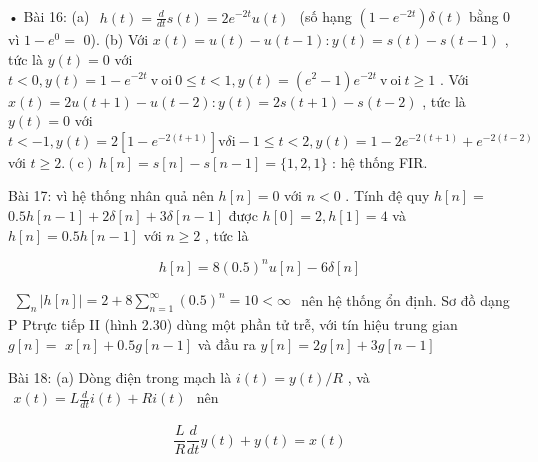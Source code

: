 \documentclass[
  10
]{article}
\begin{document}
• Bài 16: (a)
\(\begin{array} { r } { h ( t ) = \frac { d } { d t } s ( t ) = 2 e ^ { - 2 t } u ( t ) } \end{array}\)
(số hạng \(( 1 - e ^ { - 2 t } ) \delta ( t )\) bằng 0 vì
\(1 - e ^ { 0 } =\) 0). (b) Với
\(x ( t ) = u ( t ) - u ( t - 1 ) \colon y ( t ) = s ( t ) - s ( t - 1 )\)
, tức là \(y ( t ) = 0\) với
\(t < 0 , y ( t ) = 1 - e ^ { - 2 t } \mathrm { ~ v \ o i ~ } 0 \leq t < 1 , y ( t ) = ( e ^ { 2 } - 1 ) e ^ { - 2 t } \mathrm { ~ v \ o i ~ } t \geq 1\)
. Với
\(x ( t ) = 2 u ( t + 1 ) - u ( t - 2 ) \colon y ( t ) = 2 s ( t + 1 ) - s ( t - 2 )\)
, tức là \(y ( t ) = 0\) với
\(t < - 1 , y ( t ) = 2 \left[ 1 - e ^ { - 2 ( t + 1 ) } \right] \mathrm { v } \delta \mathrm { i } - 1 \leq t < 2 , y ( t ) = 1 - 2 e ^ { - 2 ( t + 1 ) } + e ^ { - 2 ( t - 2 ) }\)
với
\(t \geq 2 . \mathrm { ( c ) } \ h [ n ] = s [ n ] - s [ n - 1 ] = \{ 1 , 2 , 1 \}\)
: hệ thống FIR.

Bài 17: vì hệ thống nhân quả nên \(h [ n ] = 0\) với \(n < 0\) . Tính đệ
quy \(h [ n ] =\)
\(0 . 5 h [ n - 1 ] + 2 \delta [ n ] + 3 \delta [ n - 1 ]\) được
\(h [ 0 ] = 2 , h [ 1 ] = 4\) và \(h [ n ] = 0 . 5 h [ n - 1 ]\) với
\(n \geq 2\) , tức là

\[
h [ n ] = 8 (0. 5) ^ {n} u [ n ] - 6 \delta [ n ]
\]

\(\begin{array} { r } { \sum _ { n } | h [ n ] | = 2 + 8 \sum _ { n = 1 } ^ { \infty } ( 0 . 5 ) ^ { n } = 1 0 < \infty } \end{array}\)
nên hệ thống ổn định. Sơ đồ dạng P Ptrực tiếp II (hình 2.30) dùng một
phần tử trễ, với tín hiệu trung gian \(g [ n ] =\)
\(x [ n ] + 0 . 5 g [ n - 1 ]\) và đầu ra
\(y [ n ] = 2 g [ n ] + 3 g [ n - 1 ]\)

Bài 18: (a) Dòng điện trong mạch là \(i ( t ) = y ( t ) / R\) , và
\(\begin{array} { r } { x ( t ) = L \frac { d } { d t } i ( t ) + R i ( t ) } \end{array}\)
nên

\[
\frac {L}{R} \frac {d}{d t} y (t) + y (t) = x (t)
\]
\end{document}
